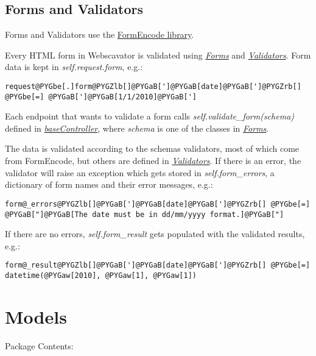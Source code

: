 \documentclass[letterpaper,10pt,english]{manual}
\begin{document}
\subsection{Forms and Validators}

Forms and Validators use the \href{http://formencode.org/}{FormEncode library}.

Every HTML form in Webscavator is validated using \hyperlink{--doc-forms}{\emph{Forms}} and \hyperlink{--doc-validators}{\emph{Validators}}. Form
data is kept in \emph{self.request.form}, e.g.:

\begin{Verbatim}[commandchars=@\[\]]
request@PYGbe[.]form@PYGZlb[]@PYGaB[']@PYGaB[date]@PYGaB[']@PYGZrb[] @PYGbe[=] @PYGaB[']@PYGaB[1/1/2010]@PYGaB[']
\end{Verbatim}

Each endpoint that wants to validate a form 
calls \emph{self.validate\_form(schema)} defined in \hyperlink{--doc-baseController}{\emph{baseController}}, where \emph{schema} is one of the 
classes in \hyperlink{--doc-forms}{\emph{Forms}}.

The data is validated according to the schemas validators, most
of which come from FormEncode, but others are defined in \hyperlink{--doc-validators}{\emph{Validators}}. If there is an error,
the validator will raise an exception which gets stored in \emph{self.form\_errors}, a dictionary
of form names and their error messages, e.g.:

\begin{Verbatim}[commandchars=@\[\]]
form@_errors@PYGZlb[]@PYGaB[']@PYGaB[date]@PYGaB[']@PYGZrb[] @PYGbe[=] @PYGaB["]@PYGaB[The date must be in dd/mm/yyyy format.]@PYGaB["]
\end{Verbatim}

If there are no errors, \emph{self.form\_result} gets populated with the validated results, e.g.:

\begin{Verbatim}[commandchars=@\[\]]
form@_result@PYGZlb[]@PYGaB[']@PYGaB[date]@PYGaB[']@PYGZrb[] @PYGbe[=] datetime(@PYGaw[2010], @PYGaw[1], @PYGaw[1])
\end{Verbatim}

\resetcurrentobjects
\hypertarget{--doc-model}{}

\section{Models}

Package Contents:
\end{document}
